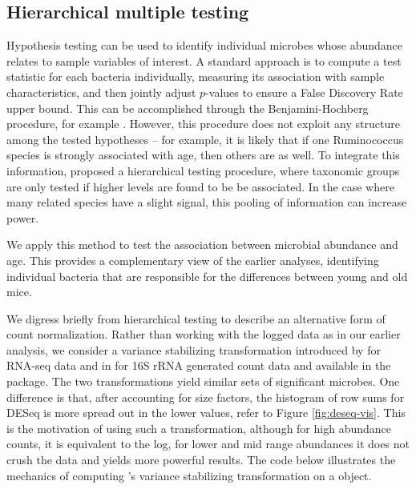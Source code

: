 \subsection*{Hierarchical multiple testing}

Hypothesis testing can be used to identify individual microbes whose
abundance relates to sample variables of interest. A standard approach
is to compute a test statistic for each bacteria individually,
measuring its association with sample characteristics, and then
jointly adjust $p$-values to ensure a False Discovery Rate upper bound. This
can be accomplished through the Benjamini-Hochberg
procedure, for example \cite{BH:1995}. However, this procedure does not exploit
any structure among the tested hypotheses -- for example, it is
likely that if one Ruminococcus species is strongly associated with
age, then others are as well. To integrate this information,
\cite{benjamini2003hierarchical,
  benjamini2014selective} proposed a hierarchical testing procedure,
where taxonomic groups are only tested if higher levels are
found to be be associated. In the case where many related species have
a slight signal, this pooling of information can increase power.

We apply this method to test the association between microbial abundance
and age. This provides a complementary view of the
earlier analyses, identifying individual bacteria that are
responsible for the differences between young and old mice.

We digress briefly from hierarchical testing to describe an
alternative form of count normalization. Rather than working with the
logged data as in our earlier analysis, we consider a
variance stabilizing transformation introduced by \cite{LoveDESeq2}
for RNA-seq data and in \cite{mcmurdie2014} for 16S rRNA generated count data
and available in the  package. The two transformations
yield similar sets of significant microbes. One difference is that,
after accounting for size factors, the histogram of row sums for DESeq is
 more spread out in the lower values, refer to Figure \ref{fig:deseq-vis}.
 This is the motivation of using such a transformation, although for
 high abundance counts, it is equivalent to the log, for lower and mid range abundances it does not crush the data and yields more powerful results.
 The code below illustrates the mechanics of computing 's
variance stabilizing transformation on a  object.

